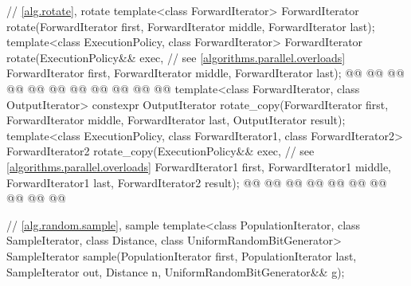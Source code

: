 \begin{codeblock}
{  // \ref{alg.rotate}, rotate
  template<class ForwardIterator>
    ForwardIterator rotate(ForwardIterator first,
                           ForwardIterator middle,
                           ForwardIterator last);
  template<class ExecutionPolicy, class ForwardIterator>
    ForwardIterator rotate(ExecutionPolicy&& exec, // see \ref{algorithms.parallel.overloads}
                           ForwardIterator first,
                           ForwardIterator middle,
                           ForwardIterator last);
  @@
    @@
      @@
      @@
        @@
    @@
      @@
      @@
                  @@
        @@
  @\added{\}}@
  template<class ForwardIterator, class OutputIterator>
    constexpr OutputIterator
      rotate_copy(ForwardIterator first, ForwardIterator middle,
                  ForwardIterator last, OutputIterator result);
  template<class ExecutionPolicy, class ForwardIterator1, class ForwardIterator2>
    ForwardIterator2
      rotate_copy(ExecutionPolicy&& exec, // see \ref{algorithms.parallel.overloads}
                  ForwardIterator1 first, ForwardIterator1 middle,
                  ForwardIterator1 last, ForwardIterator2 result);
  @@
    @@
      @@
      @@
        @@
    @@
      @@
      @@
        @@
  @\added{\}}@

  // \ref{alg.random.sample}, sample
  template<class PopulationIterator, class SampleIterator,
           class Distance, class UniformRandomBitGenerator>
    SampleIterator sample(PopulationIterator first, PopulationIterator last,
                          SampleIterator out, Distance n,
                          UniformRandomBitGenerator&& g);

}
\end{codeblock}
